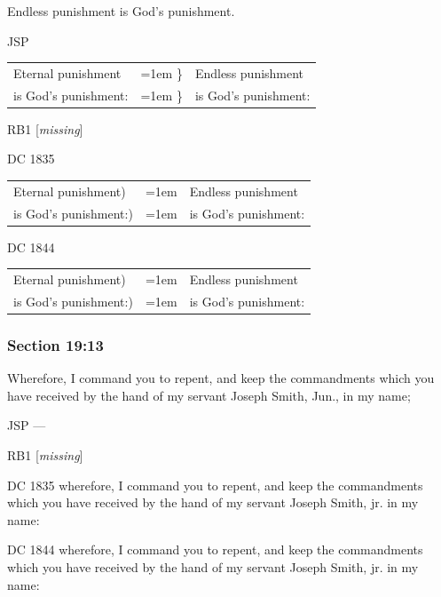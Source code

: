 		Endless punishment is God's punishment.

		\begin{framed}
		\scriptsize
			\begin{compactdesc}
				\item[JSP] \phantom{.}
				
					\begin{tabular}{p{1in}>{\hangindent=1em}p{0.2in}p{2.0in}<{\raggedright}}
					Eternal punishment & \} & Endless punishment \\
					is God's punishment: & \} & is God's punishment:
					\end{tabular}
				
				\item[RB1] [\textit{missing}]
				\item[DC 1835] \phantom{.}
					
					\begin{tabular}{p{1in}>{\hangindent=1em}p{2.0in}p{2.0in}<{\raggedright}}
					Eternal punishment) & \phantom{.} & Endless punishment \\
					is God's punishment:) & \phantom{.} & is God's punishment:
					\end{tabular}
					
				\item[DC 1844] \phantom{.}
					
					\begin{tabular}{p{1in}>{\hangindent=1em}p{2.0in}p{2.0in}<{\raggedright}}
					Eternal punishment) & \phantom{.} & Endless punishment \\
					is God's punishment:) & \phantom{.} & is God's punishment:
					\end{tabular}
			\end{compactdesc}
		\end{framed}

	\subsubsection{Section 19:13} %
		\label{DC19-13}

		Wherefore, I command you to repent, and keep the commandments which you have received by the hand of my servant Joseph Smith, Jun., in my name;

		\begin{framed}
		\scriptsize
			\begin{compactdesc}
				\item[JSP] ---
				\item[RB1] [\textit{missing}]
				\item[DC 1835] wherefore, I command you to repent, and keep the commandments which you have received by the hand of my servant Joseph Smith, jr. in my name: 
				\item[DC 1844] wherefore, I command you to repent, and keep the commandments which you have received by the hand of my servant Joseph Smith, jr. in my name: 
			\end{compactdesc}
		\end{framed}


